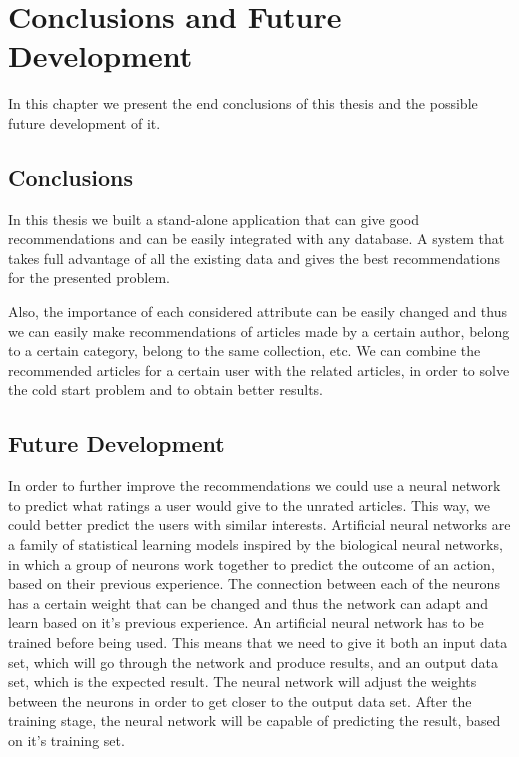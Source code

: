 \chapter{Conclusions and Future Development}
\label{chapter:conclusions-future-development}
In this chapter we present the end conclusions of this thesis and the possible future development of it.

\section{Conclusions} 
\label{sec:conclusions}
In this thesis we built a stand-alone application that can give good recommendations and can be easily integrated with any database. A system that takes full advantage of all the existing data and gives the best recommendations for the presented problem.

Also, the importance of each considered attribute can be easily changed and thus we can easily make recommendations of articles made by a certain author, belong to a certain category, belong to the same collection, etc. 
We can combine the recommended articles for a certain user with the related articles, in order to solve the cold start problem and to obtain better results.

\section{Future Development} 
\label{sec:future-development}

In order to further improve the recommendations we could use a neural network to predict what ratings a user would give to the unrated articles\cite{netflix-recommender}. This way, we could better predict the users with similar interests.
Artificial neural networks are a family of statistical learning models inspired by the biological neural networks, in which a group of neurons work together to predict the outcome of an action, based on their previous experience. The connection between each of the neurons has a certain weight that can be changed and thus the network can adapt and learn based on it's previous experience. An artificial neural network has to be trained before being used. This means that we need to give it both an input data set, which will go through the network and produce results, and an output data set, which is the expected result. The neural network will adjust the weights between the neurons in order to get closer to the output data set. After the training stage, the neural network will be capable of predicting the result, based on it's training set.

